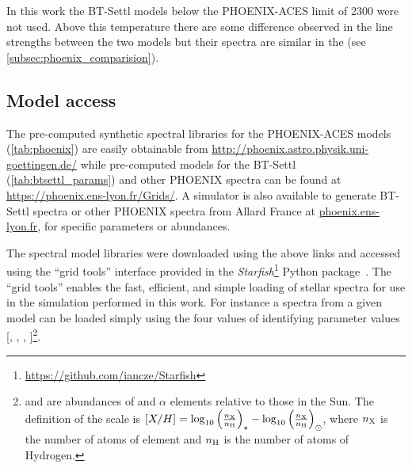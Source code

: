 

In this work the {BT-Settl} models below the {PHOENIX-ACES} limit of 2300\K{} were not used.
Above this temperature there are some difference observed in the line strengths between the two models but their spectra are similar in the \nir{} (see \cref{subsec:phoenix_comparision}).


\subsection{Model access}
\label{subsec:model_access}
The pre-computed synthetic spectral libraries for the {PHOENIX-ACES} models (\cref{tab:phoenix}) are easily obtainable from \href{http://phoenix.astro.physik.uni-goettingen.de/}{http://phoenix.astro.physik.uni-goettingen.de/} while pre-computed models for the {BT-Settl} (\cref{tab:btsettl_params}) and other {PHOENIX} spectra can be found at \href{https://phoenix.ens-lyon.fr/Grids/}{https://phoenix.ens-lyon.fr/Grids/}.
A simulator is also available to generate {BT-Settl} spectra or other {PHOENIX} spectra from {Allard France} at \href{phoenix.ens-lyon.fr}{phoenix.ens-lyon.fr}, for specific parameters or abundances.

The spectral model libraries were downloaded using the above links and accessed using the ``grid tools'' interface provided in the \emph{Starfish}\footnote{\url{https://github.com/iancze/Starfish}} Python package~\citep{czekala_constructing_2015}.
The ``grid tools'' enables the fast, efficient, and simple loading of stellar spectra for use in the simulation performed in this work.
For instance a spectra from a given model can be loaded simply using the four values of identifying parameter values [\Teff{}, \Logg{}, \feh{}, \alphafe{}]\footnote{\feh{} and \alphafe{} are abundances of  and \(\alpha\) elements relative to those in the Sun.
    The definition of the scale is \([X/H] = \log_{10}{\left(\frac{n_{\ce{X}}}{n_{\ce{H}}}\right)}_{\star} - \log_{10}{\left(\frac{n_{\ce{X}}}{n_{\ce{H}}}\right)}_{\odot}\), where $n_{\ce{X}}$ is the number of atoms of element  and $n_{\ce{H}}$ is the number of atoms of Hydrogen.}.


